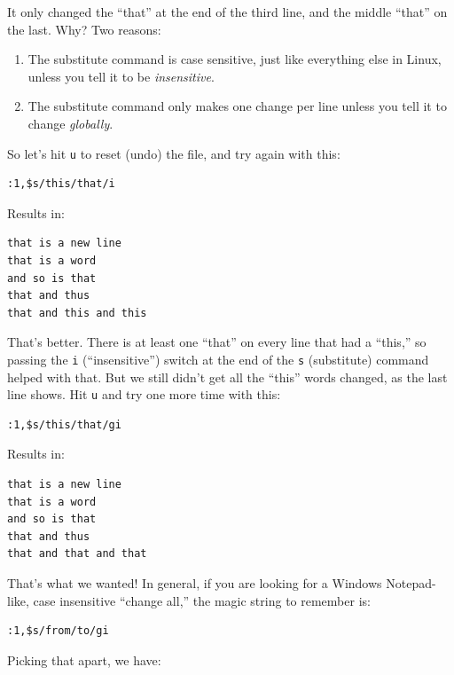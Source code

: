 \documentclass[10pt,]{book}
\numberwithin{figure}{chapter}
\begin{document}
It only changed the ``that'' at the end of the third line, and the
middle ``that'' on the last. Why? Two reasons:

\begin{enumerate}
\def\labelenumi{\arabic{enumi}.}
\item
  The substitute command is case sensitive, just like everything else in
  Linux, unless you tell it to be \emph{insensitive}.
\item
  The substitute command only makes one change per line unless you tell
  it to change \emph{globally}.
\end{enumerate}

So let's hit \texttt{u} to reset (undo) the file, and try again with
this:

\begin{verbatim}
:1,$s/this/that/i
\end{verbatim}

Results in:

\begin{verbatim}
that is a new line
that is a word
and so is that
that and thus
that and this and this
\end{verbatim}

That's better. There is at least one ``that'' on every line that had a
``this,'' so passing the \texttt{i} (``insensitive'') switch at the end
of the \texttt{s} (substitute) command helped with that. But we still
didn't get all the ``this'' words changed, as the last line shows. Hit
\texttt{u} and try one more time with this:

\begin{verbatim}
:1,$s/this/that/gi
\end{verbatim}

Results in:

\begin{verbatim}
that is a new line
that is a word
and so is that
that and thus
that and that and that
\end{verbatim}

That's what we wanted! In general, if you are looking for a Windows
Notepad-like, case insensitive ``change all,'' the magic string to
remember is:

\begin{verbatim}
:1,$s/from/to/gi
\end{verbatim}

Picking that apart, we have:
\end{document}
